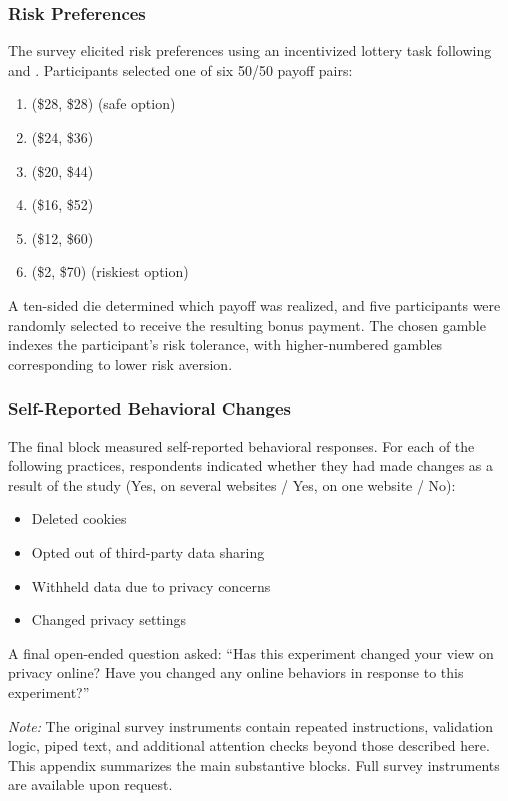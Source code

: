 \documentclass[12pt]{article}
\theoremstyle{definition}
\theoremstyle{remark}
\begin{document}
\begin{appendix}
\subsubsection{Risk Preferences}\label{sec:survey_endline_risk}

The survey elicited risk preferences using an incentivized lottery task following \cite{CHARNESS201343} and \cite{RePEc:kap:jrisku:v:41:y:2010:i:3:p:219-243}. Participants selected one of six 50/50 payoff pairs:
\begin{enumerate}[leftmargin=2em,itemsep=1pt]
    \item (\$28, \$28) (safe option)
    \item (\$24, \$36)
    \item (\$20, \$44)
    \item (\$16, \$52)
    \item (\$12, \$60)
    \item (\$2, \$70) (riskiest option)
\end{enumerate}
A ten-sided die determined which payoff was realized, and five participants were randomly selected to receive the resulting bonus payment. The chosen gamble indexes the participant's risk tolerance, with higher-numbered gambles corresponding to lower risk aversion.

\subsubsection{Self-Reported Behavioral Changes}\label{sec:survey_endline_behavior}

The final block measured self-reported behavioral responses. For each of the following practices, respondents indicated whether they had made changes as a result of the study (Yes, on several websites / Yes, on one website / No):
\begin{itemize}[leftmargin=2em,itemsep=1pt]
    \item Deleted cookies
    \item Opted out of third-party data sharing
    \item Withheld data due to privacy concerns
    \item Changed privacy settings
\end{itemize}
A final open-ended question asked: ``Has this experiment changed your view on privacy online? Have you changed any online behaviors in response to this experiment?''

\vspace{6pt}
\noindent\textit{Note:} The original survey instruments contain repeated instructions, validation logic, piped text, and additional attention checks beyond those described here. This appendix summarizes the main substantive blocks. Full survey instruments are available upon request.
\end{appendix}
\end{document}
